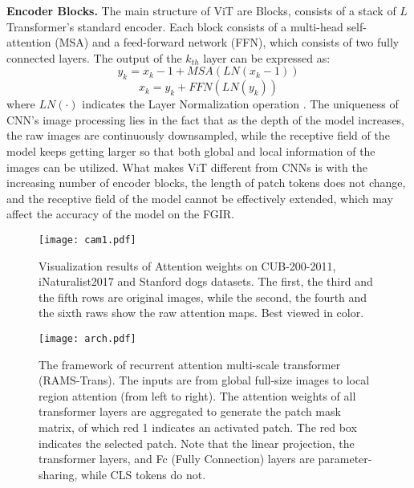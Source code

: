 \documentclass[sigconf]{acmart}
\begin{document}
\textbf{Encoder Blocks.} The main structure of ViT are Blocks, consists of a stack of $L$ Transformer's standard encoder. Each block consists of a multi-head self-attention (MSA) and a feed-forward network (FFN), which consists of two fully connected layers. The output of the $k_{th}$ layer can be expressed as:
\begin{equation}
    y_k = x_k - 1 + MSA(LN(x_k - 1))  
\end{equation}
\begin{equation}
x_k = y_k + FFN(LN(y_k))    
\end{equation}
where $LN(\cdot)$ indicates the Layer Normalization operation \cite{LN}. The uniqueness of CNN's image processing lies in the fact that as the depth of the model increases, the raw images are continuously downsampled, while the receptive field of the model keeps getting larger so that both global and local information of the images can be utilized. What makes ViT different from CNNs is with the increasing number of encoder blocks, the length of patch tokens does not change, and the receptive field of the model cannot be effectively extended, which may affect the accuracy of the model on the FGIR.

\begin{figure}[h]
\centering
\texttt{[image: cam1.pdf]}
\caption{Visualization results of Attention weights on CUB-200-2011, iNaturalist2017 and Stanford dogs datasets. The first, the third and the fifth rows are original images, while the second, the fourth and the sixth raws show the raw attention maps. Best viewed in color.}
\end{figure}

\begin{figure*}[t]
\centering
\texttt{[image: arch.pdf]}
\caption{The framework of recurrent attention multi-scale transformer (RAMS-Trans). The inputs are from global full-size images to local region attention (from left to right). The attention weights of all transformer layers are aggregated to generate the patch mask matrix, of which red 1 indicates an activated patch. The red box indicates the selected patch. Note that the linear projection, the transformer layers, and Fc (Fully Connection) layers are parameter-sharing, while CLS tokens do not.}
\end{figure*}
\end{document}
